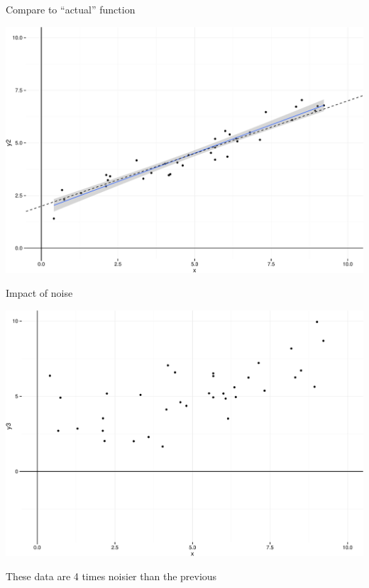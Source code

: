 \documentclass[ignorenonframetext,]{beamer}
\begin{document}
\begin{frame}{Compare to ``actual'' function}

\includegraphics{Regression_files/figure-beamer/unnamed-chunk-6-1.pdf}

\end{frame}

\begin{frame}{Impact of noise}

\includegraphics{Regression_files/figure-beamer/unnamed-chunk-7-1.pdf}

These data are 4 times noisier than the previous

\end{frame}
\end{document}
